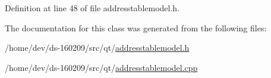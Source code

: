 Definition at line 48 of file addresstablemodel.\+h.



The documentation for this class was generated from the following files\+:\begin{DoxyCompactItemize}
\item 
/home/dev/ds-\/160209/src/qt/\hyperlink{addresstablemodel_8h}{addresstablemodel.\+h}\item 
/home/dev/ds-\/160209/src/qt/\hyperlink{addresstablemodel_8cpp}{addresstablemodel.\+cpp}\end{DoxyCompactItemize}
